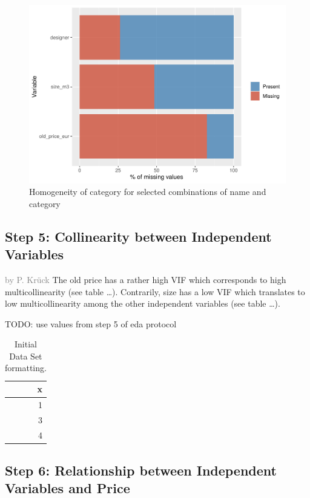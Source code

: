 \documentclass[a4paper, nobind]{templates/ociamthesis}
\begin{document}
\begin{figure}[!h]
\includegraphics[width=1\linewidth]{_main_files/figure-latex/missing-values-1} \caption{Homogeneity of category for selected combinations of name and category}\label{fig:missing-values}
\end{figure}

\hypertarget{step-5-collinearity-between-independent-variables}{%
\subsection{Step 5: Collinearity between Independent Variables}\label{step-5-collinearity-between-independent-variables}}

\textcolor{gray}{by P. Krück}
The old price has a rather high VIF which corresponds to high multicollinearity (see table \ldots{}). Contrarily, size has a low VIF which translates to low multicollinearity among the other independent variables (see table \ldots{}).

TODO: use values from step 5 of eda protocol

\begin{table}

\caption{\label{tab:initial-ikea2}Initial Data Set formatting.}
\centering
\begin{tabular}[t]{r}
\hline
x\\
\hline
1\\
\hline
3\\
\hline
4\\
\hline
\end{tabular}
\end{table}

\hypertarget{relationship}{%
\subsection{Step 6: Relationship between Independent Variables and Price}\label{relationship}}
\end{document}
